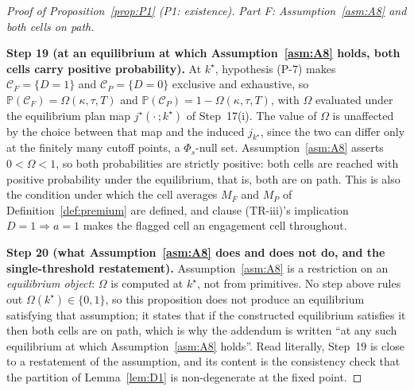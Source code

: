 \documentclass[11pt]{article}
\newcommand{\Prb}{\mathbb{P}}
\begin{document}
\begin{proof}[Proof of Proposition~\ref{prop:P1} (P1: existence)]
\medskip
\noindent\emph{Part F: Assumption~\ref{asm:A8} and both cells on path.}

\smallskip
\noindent\textbf{Step 19 (at an equilibrium at which Assumption~\ref{asm:A8} holds, both cells carry
positive probability).}
At $k^\star$, hypothesis (P-7) makes $\mathcal C_F = \{D=1\}$ and $\mathcal C_P = \{D=0\}$ exclusive
and exhaustive, so $\Prb(\mathcal C_F) = \Omega(\kappa,\tau,T)$ and
$\Prb(\mathcal C_P) = 1-\Omega(\kappa,\tau,T)$, with $\Omega$ evaluated under the equilibrium plan
map $j^\star(\cdot\,;k^\star)$ of Step~17(i). The value of $\Omega$ is unaffected by the choice
between that map and the induced $j_{k^\star}$, since the two can differ only at the finitely many
cutoff points, a $\Phi_s$-null set. Assumption~\ref{asm:A8} asserts $0 < \Omega < 1$, so both
probabilities are strictly positive: both cells are reached with positive probability under the
equilibrium, that is, both are on path. This is also the condition under which the cell averages
$M_F$ and $M_P$ of Definition~\ref{def:premium} are defined, and clause (TR-iii)'s implication
$D = 1 \Rightarrow a = 1$ makes the flagged cell an engagement cell throughout.

\smallskip
\noindent\textbf{Step 20 (what Assumption~\ref{asm:A8} does and does not do, and the single-threshold
restatement).}
Assumption~\ref{asm:A8} is a restriction on an \emph{equilibrium object}: $\Omega$ is computed at
$k^\star$, not from primitives. No step above rules out $\Omega(k^\star) \in \{0,1\}$, so this
proposition does not produce an equilibrium satisfying that assumption; it states that if the
constructed equilibrium satisfies it then both cells are on path, which is why the addendum is
written ``at any such equilibrium at which Assumption~\ref{asm:A8} holds''. Read literally, Step~19
is close to a restatement of the assumption, and its content is the consistency check that the
partition of Lemma~\ref{lem:D1} is non-degenerate at the fixed point.


\end{proof}
\end{document}
